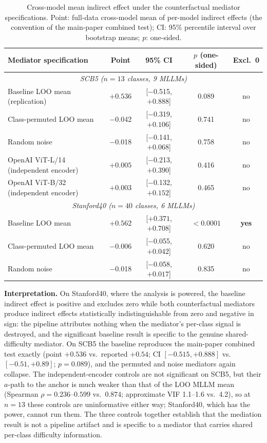 \documentclass[11pt,a4paper]{article}
\begin{document}
\begin{table}[H]
\centering
\caption{Cross-model mean indirect effect under the counterfactual mediator specifications. Point: full-data cross-model mean of per-model indirect effects (the convention of the main-paper combined test); CI: 95\% percentile interval over bootstrap means; $p$: one-sided.}
\label{tab:mediation_controls}
\small
\begin{tabular}{lcccc}
\toprule
Mediator specification & Point & 95\% CI & $p$ (one-sided) & Excl.\ 0 \\
\midrule
\multicolumn{5}{c}{\textit{SCB5 ($n=13$ classes, 9 MLLMs)}} \\
\midrule
Baseline LOO mean (replication) & $+0.536$ & [$-$0.515, $+0.888$] & 0.089 & no \\
Class-permuted LOO mean & $-$0.042 & [$-$0.319, $+0.106$] & 0.741 & no \\
Random noise & $-$0.018 & [$-$0.141, $+0.068$] & 0.758 & no \\
OpenAI ViT-L/14 (independent encoder) & $+0.005$ & [$-$0.213, $+0.390$] & 0.416 & no \\
OpenAI ViT-B/32 (independent encoder) & $+0.003$ & [$-$0.132, $+0.152$] & 0.465 & no \\
\midrule
\multicolumn{5}{c}{\textit{Stanford40 ($n=40$ classes, 6 MLLMs)}} \\
\midrule
Baseline LOO mean & $+0.562$ & [$+0.371$, $+0.708$] & $<0.0001$ & \textbf{yes} \\
Class-permuted LOO mean & $-$0.006 & [$-$0.055, $+0.042$] & 0.620 & no \\
Random noise & $-$0.018 & [$-$0.058, $+0.017$] & 0.835 & no \\
\bottomrule
\end{tabular}
\end{table}

\textbf{Interpretation.} On Stanford40, where the analysis is powered, the baseline indirect effect is positive and excludes zero while both counterfactual mediators produce indirect effects statistically indistinguishable from zero and negative in sign: the pipeline attributes nothing when the mediator's per-class signal is destroyed, and the significant baseline result is specific to the genuine shared-difficulty mediator. On SCB5 the baseline reproduces the main-paper combined test exactly (point $+0.536$ vs.\ reported $+0.54$; CI $[-0.515, +0.888]$ vs.\ $[-0.51, +0.89]$; $p=0.089$), and the permuted and noise mediators again collapse. The independent-encoder controls are not significant on SCB5, but their $a$-path to the anchor is much weaker than that of the LOO MLLM mean (Spearman $\rho = 0.236$--$0.599$ vs.\ $0.874$; approximate VIF 1.1--1.6 vs.\ 4.2), so at $n=13$ these controls are uninformative either way; Stanford40, which has the power, cannot run them. The three controls together establish that the mediation result is not a pipeline artifact and is specific to a mediator that carries shared per-class difficulty information.
\end{document}

